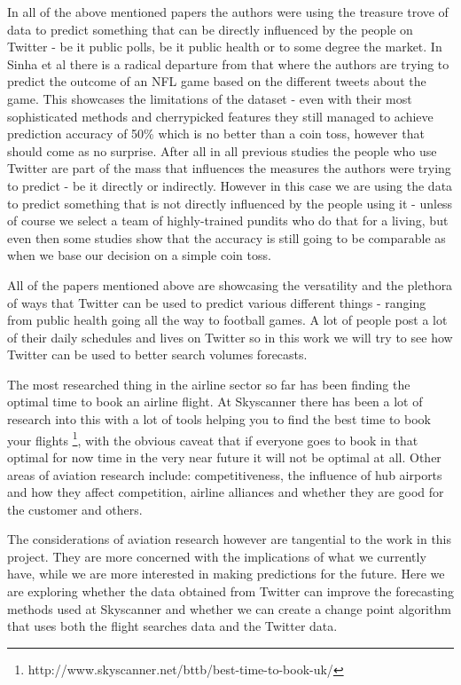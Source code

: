 \documentclass[minf,twoside,singlespacing,parskip,frontabs,notimes,12pt]{infthesis} %
\begin{document}
In all of the above mentioned papers the authors were using the treasure trove of data to predict something that can be directly influenced by the people on Twitter - be it public polls, be it public health or to some degree the market. In Sinha et al\cite{twitnfl} there is a radical departure from that where the authors are trying to predict the outcome of an NFL game based on the different tweets about the game. This showcases the limitations of the dataset - even with their most sophisticated methods and cherrypicked features they still managed to achieve prediction accuracy of 50\% which is no better than a coin toss, however that should come as no surprise. After all in all previous studies the people who use Twitter are part of the mass that influences the measures the authors were trying to predict - be it directly or indirectly. However in this case we are using the data to predict something that is not directly influenced by the people using it - unless of course we select a team of highly-trained pundits who do that for a living, but even then some studies show that the accuracy is still going to be comparable as when we base our decision on a simple coin toss.  

All of the papers mentioned above are showcasing the versatility and the plethora of ways that Twitter can be used to predict various different things - ranging from public health going all the way to football games. 
A lot of people post a lot of their daily schedules and lives on Twitter so in this work we will try to see how Twitter can be used to better search volumes forecasts. 


The most researched thing in the airline sector so far has been finding the optimal time to book an airline flight\cite{Hamletkdd03,ijcai}. 
At Skyscanner there has been a lot of research into this with a lot of tools helping you to find the best time to book your flights \footnote{http://www.skyscanner.net/bttb/best-time-to-book-uk/}, with the obvious caveat that if everyone goes to book in that optimal for now time in the very near future it will not be optimal at all. 
Other areas of aviation research include: competitiveness, the influence of hub airports and how they affect competition, airline alliances and whether they are good for the customer and others. 


The considerations of aviation research however are tangential to the work in this project. 
They are more concerned with the implications of what we currently have, while we are more interested in making predictions for the future. 
Here we are exploring whether the data obtained from Twitter can improve the forecasting methods used at Skyscanner and whether we can create a change point algorithm that uses both the flight searches data and the Twitter data. 
\end{document}
